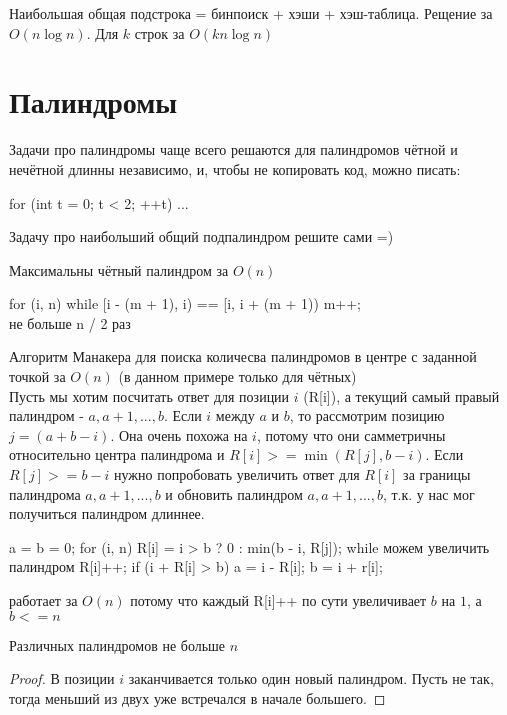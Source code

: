 \begin{Rem}
Наибольшая общая подстрока = бинпоиск + хэши + хэш-таблица. Рещение за $O(n \log n)$. Для $k$ строк за  $O(kn \log n)$
\end{Rem}
\chapter{Палиндромы}
Задачи про палиндромы чаще всего решаются для палиндромов чётной и нечётной длинны независимо, и, чтобы не копировать код, можно писать:
\begin{cppcode}
for (int t = 0; t < 2; ++t) {
	...
}
\end{cppcode}

Задачу про наибольший общий подпалиндром решите сами =)

Максимальны чётный палиндром за $O(n)$
\begin{cppcode}
for (i, n) {
	while [i - (m + 1), i) == [i, i + (m + 1)) {
		m++; \\ не больше n / 2 раз
	}
}
\end{cppcode}
Алгоритм Манакера для поиска количесва палиндромов в центре с заданной точкой за $O(n)$ (в данном примере только для чётных)\\
Пусть мы хотим посчитать ответ для позиции $i$ (R[i]), а текущий самый правый палиндром - $a, a + 1, ..., b$. Если $i$ между $a$ и $b$, то рассмотрим позицию $j = (a + b - i)$. Она очень похожа на $i$, потому что они самметричны относительно центра палиндрома и $R[i] >= \min(R[j], b - i)$. Если $R[j] >= b - i$ нужно попробовать увеличить ответ для $R[i]$  за границы палиндрома $a, a + 1, ...,  b$ и обновить палиндром $a, a + 1, ...,  b$, т.к. у нас мог получиться палиндром длиннее.
\\
\begin{cppcode}
a = b = 0;
for (i, n) {
	R[i] = i > b ? 0 : min(b - i, R[j]);
	while можем увеличить палиндром {
		R[i]++;
	}
	if (i + R[i] > b) {
		a = i - R[i];
		b = i + r[i];
	}
}
\end{cppcode}
работает за $O(n)$ потому что каждый R[i]++ по сути увеличивает $b$ на $1$, а $b <= n$

\begin{theorem}
Различных палиндромов не больше $n$
\end{theorem}
\begin{proof}
В позиции $i$ заканчивается только один новый палиндром. Пусть не так, тогда меньший из двух уже встречался в начале большего. 
\end{proof}


